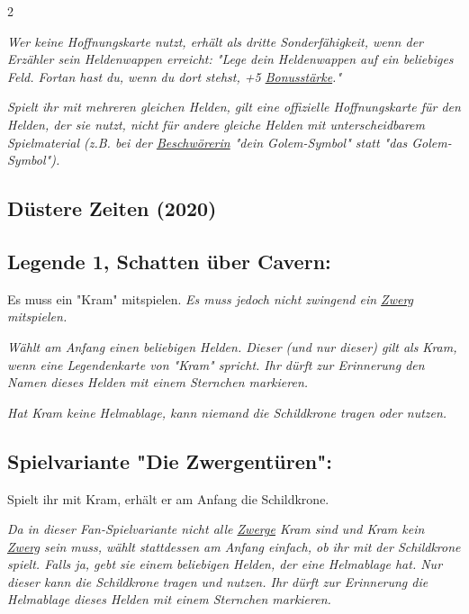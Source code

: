 \documentclass[10pt, a4paper, oneside]{book}
\newcommand{\fan}[1]{\textit{#1}}
\begin{document}
\begin{multicols*}{2}
\begin{bgcolor}
\fan{Wer keine Hoffnungskarte nutzt, erhält als dritte Sonderfähigkeit, wenn der Erzähler sein Heldenwappen erreicht: "Lege dein Heldenwappen auf ein beliebiges Feld. Fortan hast du, wenn du dort stehst, +5 \hyperref[Bonusstärke]{Bonusstärke}."}

\fan{Spielt ihr mit mehreren gleichen Helden, gilt eine offizielle Hoffnungskarte für den Helden, der sie nutzt, nicht für andere gleiche Helden mit unterscheidbarem Spielmaterial (z.B. bei der \hyperref[Beschwörerin]{Beschwörerin} "dein Golem-Symbol" statt "das Golem-Symbol").}

\end{bgcolor}



\columnbreak


\begin{bgcolor}[color-DZ]
\section{Düstere Zeiten (2020)}


\subsection{Legende 1, Schatten über Cavern:}

Es muss ein "Kram" mitspielen.
\supercite{DZ:Begleitheft} 
\fan{Es muss jedoch nicht zwingend ein \hyperref[Zwerg]{Zwerg} mitspielen.} 

\fan{Wählt am Anfang einen beliebigen Helden. Dieser (und nur dieser) gilt als Kram, wenn eine Legendenkarte von "Kram" spricht. Ihr dürft zur Erinnerung den Namen dieses Helden mit einem Sternchen markieren.}

\fan{Hat Kram keine Helmablage, kann niemand die Schildkrone tragen oder nutzen.}

\subsection{Spielvariante "Die Zwergentüren":}

Spielt ihr mit Kram, erhält er am Anfang die Schildkrone.
\supercite{DZ:Begleitheft}

\fan{Da in dieser Fan-Spielvariante nicht alle \hyperref[Zwerg]{Zwerge} Kram sind und Kram kein \hyperref[Zwerg]{Zwerg} sein muss, wählt stattdessen am Anfang einfach, ob ihr mit der Schildkrone spielt. Falls ja, gebt sie einem beliebigen Helden, der eine Helmablage hat. Nur dieser kann die Schildkrone tragen und nutzen. Ihr dürft zur Erinnerung die Helmablage dieses Helden mit einem Sternchen markieren.}


\end{bgcolor}
\end{multicols*}
\end{document}
